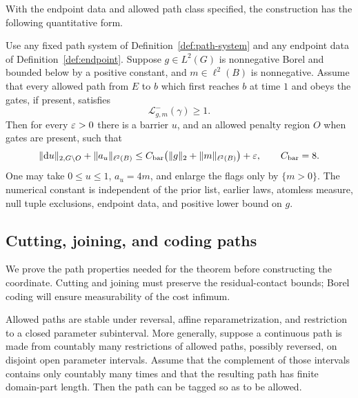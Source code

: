 With the endpoint data and allowed path class specified, the construction
has the following quantitative form.

\begin{theorem}\label{thm:barrier}
Use any fixed path system of Definition~\ref{def:path-system} and
any endpoint data of Definition~\ref{def:endpoint}.  Suppose
$g\in L^2(G)$ is nonnegative Borel and bounded below by a positive
constant, and $m\in\ell^2(B)$ is nonnegative.  Assume that every
allowed path from $E$ to $b$ which first reaches $b$ at time $1$
and obeys the gates, if present, satisfies
\[
 \mathcal L^-_{g,m}(\gamma)\ge1.
\]
Then for every $\varepsilon>0$ there is a barrier $u$, and an allowed
penalty region $O$ when gates are present, such that
\begin{equation}\label{eq:barrier-bound}
 \|\mathrm d u\|_{2,G\setminus O}+\|a_u\|_{\ell^2(B)}
 \le C_{\mathrm{bar}}
       \bigl(\|g\|_2+\|m\|_{\ell^2(B)}\bigr)+\varepsilon,
 \qquad C_{\mathrm{bar}}=8.
\end{equation}
One may take $0\le u\le1$, $a_u=4m$, and enlarge the flags only
by $\{m>0\}$.  The numerical constant is independent of the prior
list, earlier laws, atomless measure, null tuple exclusions, endpoint
data, and positive lower bound on $g$.
\end{theorem}

\subsection{Cutting, joining, and coding paths}

We prove the path properties needed for the theorem before constructing
the coordinate.  Cutting and joining must preserve the residual-contact
bounds; Borel coding will ensure measurability of the cost infimum.

\begin{lemma}
\label{lem:path-stability}
Allowed paths are stable under reversal, affine reparametrization,
and restriction to a closed parameter subinterval.  More generally,
suppose a continuous path is made from countably many restrictions of
allowed paths, possibly reversed, on disjoint open parameter intervals.
Assume that the complement of those intervals contains only countably
many times and that the resulting path has finite domain-part length.
Then the path can be tagged so as to be allowed.
\end{lemma}


